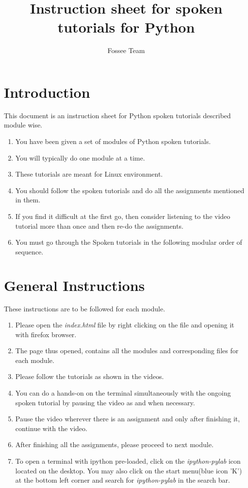 \documentclass[11pt,twocolumn]{article}
\begin{document}
\title{Instruction sheet for spoken tutorials for Python}
\author{Fossee Team}
\maketitle
\section*{Introduction }
{This document is an instruction sheet for Python spoken tutorials described module wise.}
\setlength{\columnsep}{15pt }
\begin{enumerate}
  \item You have been given a set of modules of Python spoken tutorials.
  \item You will typically do one module at a time.
  \item These tutorials are meant for Linux environment.
  \item You should follow the spoken tutorials and do all the assignments mentioned in them.
   \item If you find it difficult at the first go, then consider listening to the video tutorial more than once and then re-do the assignments.
   \item You must go through the Spoken tutorials in the following modular order of sequence. 
  

\end{enumerate}

\section*{General Instructions}
{These instructions are to be followed for each module.}
\setlength{\columnsep}{15pt }
\begin{enumerate}
	  
	
	\item Please open the \emph{index.html} file by right clicking on the file and opening it with firefox browser.
     \item  The page thus opened, contains all the modules and corresponding files for each module.
  \item Please follow the tutorials as shown in the videos.
  \item You can do a hands-on on the terminal simultaneously with the ongoing spoken tutorial by pausing the video as and when necessary.
  \item Pause the video wherever there is an assignment and only after finishing it, continue with the video.
  \item After finishing all the assignments, please proceed to next module. 
\item To open a terminal with ipython pre-loaded, click on the \emph{ipython-pylab} icon located on the desktop. You may also click on the start menu(blue icon 'K') at the bottom left corner and search for \emph{ipython-pylab} in the search bar.


\end{enumerate}
\end{document}
